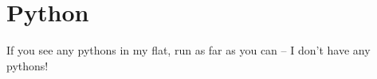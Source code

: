 \chapter{Python}
If you see any pythons in my flat, run as far as you can -- I don't have any pythons!